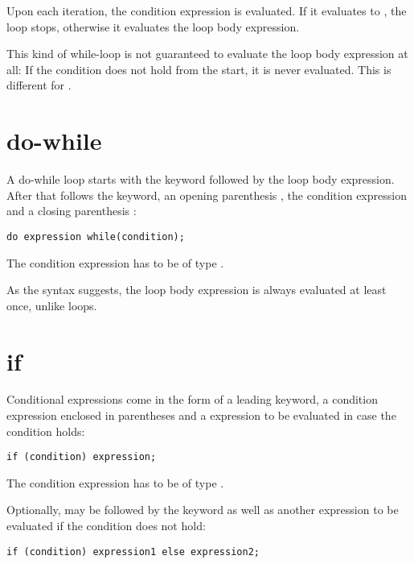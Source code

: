 Upon each iteration, the condition expression is evaluated. If it evaluates to , the loop stops, otherwise it evaluates the loop body expression.


This kind of while-loop is not guaranteed to evaluate the loop body expression at all: If the condition does not hold from the start, it is never evaluated. This is different for .

\section{do-while}
\label{expression-do-while}

A do-while loop starts with the  keyword followed by the loop body expression. After that follows the  keyword, an opening parenthesis \expr{(}, the condition expression and a closing parenthesis \expr{)}:

\begin{lstlisting}
do expression while(condition);
\end{lstlisting}

The condition expression has to be of type .

As the syntax suggests, the loop body expression is always evaluated at least once, unlike  loops.

\section{if}
\label{expression-if}

Conditional expressions come in the form of a leading  keyword, a condition expression enclosed in parentheses \expr{()} and a expression to be evaluated in case the condition holds:

\begin{lstlisting}
if (condition) expression;
\end{lstlisting}

The condition expression has to be of type .

Optionally,  may be followed by the  keyword as well as another expression to be evaluated if the condition does not hold:

\begin{lstlisting}
if (condition) expression1 else expression2;
\end{lstlisting}


